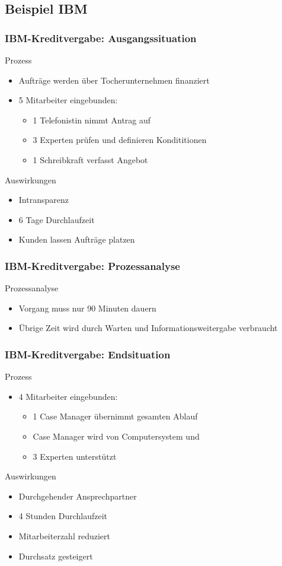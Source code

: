 \documentclass{beamer}
\begin{document}
 \subsection[Beispiel IBM]{Beispiel IBM}
 \begin{frame}
  \frametitle{IBM-Kreditvergabe: Ausgangssituation}
  Prozess
  \begin{itemize}
    \item Aufträge werden über Tocherunternehmen finanziert
    \item 5 Mitarbeiter eingebunden:
    \begin{itemize}
      \item 1 Telefonistin nimmt Antrag auf
      \item 3 Experten prüfen und definieren Kondititionen
      \item 1 Schreibkraft verfasst Angebot
    \end{itemize}
  \end{itemize}
  Auswirkungen
  \begin{itemize}
    \item Intransparenz
    \item 6 Tage Durchlaufzeit
    \item Kunden lassen Aufträge platzen
  \end{itemize}
 \end{frame}

 \begin{frame}
  \frametitle{IBM-Kreditvergabe: Prozessanalyse}
  Prozessanalyse
  \begin{itemize}
    \item Vorgang muss nur 90 Minuten dauern
    \item Übrige Zeit wird durch Warten und Informationsweitergabe verbraucht
  \end{itemize}
 \end{frame}

 \begin{frame}
  \frametitle{IBM-Kreditvergabe: Endsituation}
  Prozess
  \begin{itemize}
    \item 4 Mitarbeiter eingebunden:
    \begin{itemize}
      \item 1 Case Manager übernimmt gesamten Ablauf
      \item Case Manager wird von Computersystem und
      \item 3 Experten unterstützt
    \end{itemize}
  \end{itemize}

  Auswirkungen
  \begin{itemize}
    \item Durchgehender Ansprechpartner
    \item 4 Stunden Durchlaufzeit
    \item Mitarbeiterzahl reduziert
    \item Durchsatz gesteigert
  \end{itemize}
 \end{frame}
\end{document}
